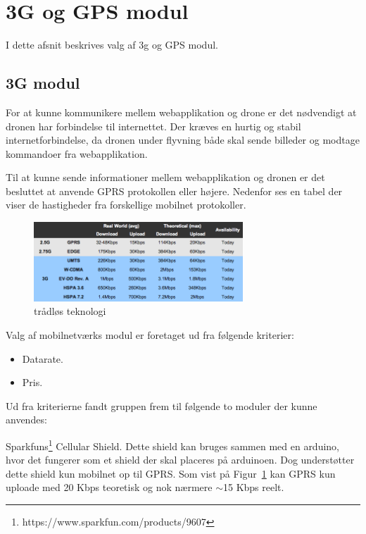 \section{3G og GPS modul}

I dette afsnit beskrives valg af 3g og GPS modul. 

\subsection{3G modul}
For at kunne kommunikere mellem webapplikation og drone er det nødvendigt at dronen har forbindelse til internettet. 
Der kræves en hurtig og stabil internetforbindelse, da dronen under flyvning både skal sende billeder og modtage kommandoer fra webapplikation.

Til at kunne sende informationer mellem webapplikation og dronen er det besluttet at anvende GPRS protokollen eller højere. Nedenfor ses en tabel der viser de hastigheder fra forskellige mobilnet protokoller. 

\begin{figure}[H]
\centering
\includegraphics[width=0.7\textwidth]{Billeder/3g-table.png}
\caption[trådløs_teknologi]{trådløs teknologi\protect\footnotemark}
\label{fig:3gtable}
\end{figure}


Valg af mobilnetværks modul er foretaget ud fra følgende kriterier:
\begin{itemize}
	\item Datarate.
	\item Pris.
\end{itemize}

Ud fra kriterierne fandt gruppen frem til følgende to moduler der kunne anvendes:

Sparkfuns\footnote{https://www.sparkfun.com/products/9607} Cellular Shield. Dette shield kan bruges sammen med en arduino, hvor det fungerer som et shield der skal placeres på arduinoen. Dog understøtter dette shield kun mobilnet op til GPRS. Som vist på Figur~\ref{fig:3gtable} kan GPRS kun uploade med 20 Kbps teoretisk og nok nærmere $\sim$15 Kbps reelt.


